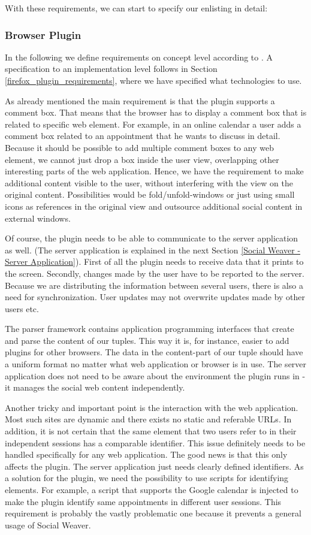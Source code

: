 With these requirements, we can start to specify our enlisting in detail:

\subsubsection{Browser Plugin}\label{browser_plugin}
In the following we define requirements on concept level according to \cite{van2009requirements}. A specification to an implementation level follows in Section \ref{firefox_plugin_requirements}, where we have specified what technologies to use.

As already mentioned the main requirement is that the plugin supports a comment box. That means that the browser has to display a comment box that is related to specific web element. For example, in an online calendar a user adds a comment box related to an appointment that he wants to discuss in detail. 
Because it should be possible to add multiple comment boxes to any web element, we cannot just drop a box inside the user view, overlapping other interesting parts of the web application. Hence, we have the requirement to make additional content visible to the user, without interfering with the view on the original content. Possibilities would be fold/unfold-windows or just using small icons as references in the original view and outsource additional social content in external windows.

Of course, the plugin needs to be able to communicate to the server application as well. (The server application is explained in the next Section \ref{Social Weaver - Server Application}). First of all the plugin needs to receive data that it prints to the screen. Secondly, changes made by the user have to be reported to the server. Because we are distributing the information between several users, there is also a need for synchronization. User updates may not overwrite updates made by other users etc.

The parser framework contains application programming interfaces that create and parse the content of our tuples. This way it is, for instance, easier to add plugins for other browsers. 
The data in the content-part of our tuple should have a uniform format no matter what web application or browser is in use. The server application does not need to be aware about the environment the plugin runs in - it manages the social web content independently.

Another tricky and important point is the interaction with the web application. Most such sites are dynamic and there exists no static and referable URLs. In addition, it is not certain that the same element that two users refer to in their independent sessions has a comparable identifier. This issue definitely needs to be handled specifically for any web application. The good news is that this only affects the plugin. The server application just needs clearly defined identifiers. As a solution for the plugin, we need the possibility to use scripts for identifying elements. For example, a script that supports the Google calendar is injected to make the plugin identify same appointments in different user sessions. This requirement is probably the vastly problematic one because it prevents a general usage of Social Weaver.

